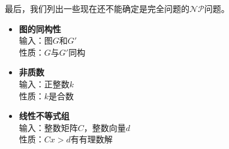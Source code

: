 \documentclass[twocolumn]{article}
\theoremstyle{nonumberplain}%
\begin{document}
    最后，我们列出一些现在还不能确定是完全问题的$\mathcal{NP}$问题。
    \begin{itemize}
      \item {\bf 图的同构性}\\
      输入：图$G$和$G'$\\
      性质：$G$与$G'$同构

      \item {\bf 非质数}\\
          输入：正整数$k$\\
          性质：$k$是合数

      \item {\bf 线性不等式组}\\
      输入：整数矩阵$C$，整数向量$d$\\
      性质：$Cx>d$有有理数解
    \end{itemize}
\end{document}
